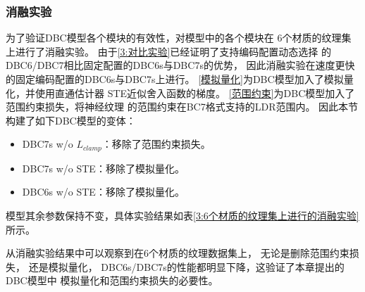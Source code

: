 \subsubsection{消融实验}

为了验证DBC模型各个模块的有效性，对模型中的各个模块在
6个材质的纹理集上进行了消融实验。
由于\ref{3:对比实验}已经证明了支持编码配置动态选择
的DBC6/DBC7相比固定配置的DBC6s与DBC7s的优势，
因此消融实验在速度更快的固定编码配置的DBC6s与DBC7s上进行。
\ref{模拟量化}为DBC模型加入了模拟量化，并使用直通估计器
STE\cite{bengio2013estimating}近似舍入函数的梯度。
\ref{范围约束}为DBC模型加入了范围约束损失，将神经纹理
的范围约束在BC7格式支持的LDR范围内。
因此本节构建了如下DBC模型的变体：
\begin{itemize}
    \item DBC7s w/o $L_{clamp}$：移除了范围约束损失。
    \item DBC7s w/o STE：移除了模拟量化。
    \item DBC6s w/o STE：移除了模拟量化。
\end{itemize}
模型其余参数保持不变，具体实验结果如表\ref{3:6个材质的纹理集上进行的消融实验}所示。

从消融实验结果中可以观察到在6个材质的纹理数据集上，
无论是删除范围约束损失，
还是模拟量化，
DBC6s/DBC7s的性能都明显下降，这验证了本章提出的DBC模型中
模拟量化和范围约束损失的必要性。

